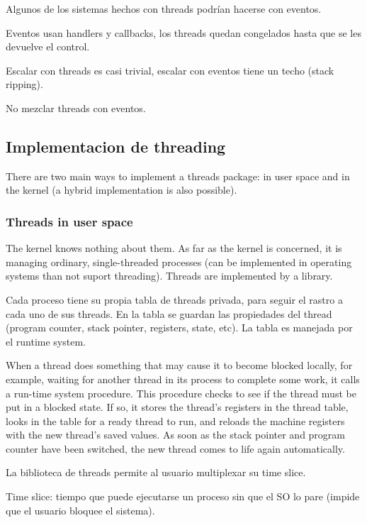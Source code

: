 \documentclass[a4paper, twoside]{article}
\begin{document}
Algunos de los sistemas hechos con threads podrían hacerse con eventos.

Eventos usan handlers y callbacks, los threads quedan congelados hasta que
se les devuelve el control.

Escalar con threads es casi trivial, escalar con eventos tiene un techo
(stack ripping).

No mezclar threads con eventos.

\subsection{Implementacion de threading}

There are two main ways to implement a threads package: in user space and in
the kernel (a hybrid implementation is also possible).

\subsubsection{Threads in user space}

The kernel knows nothing about them. As far as the kernel is concerned,
it is managing ordinary, single-threaded processes (can be implemented
in operating systems than not suport threading).
Threads are implemented by a library.

Cada proceso tiene su propia tabla de threads privada, para seguir el rastro
a cada uno de sus threads.
En la tabla se guardan las propiedades del thread (program counter,
stack pointer, registers, state, etc).
La tabla es manejada por el runtime system.

When a thread does something that may cause it to become blocked locally,
for example, waiting for another thread in its process to complete some work,
it calls a run-time system procedure.
This procedure checks to see if the thread must be put in a blocked state.
If so, it stores the thread’s registers in the thread table, looks in the table
for a ready thread to run, and reloads the machine registers with the new
thread's saved values.
As soon as the stack pointer and program counter have been switched,
the new thread comes to life again automatically.

La biblioteca de threads permite al usuario multiplexar su time slice.

Time slice: tiempo que puede ejecutarse un proceso sin que el SO lo pare
(impide que el usuario bloquee el sistema).\\
\end{document}
